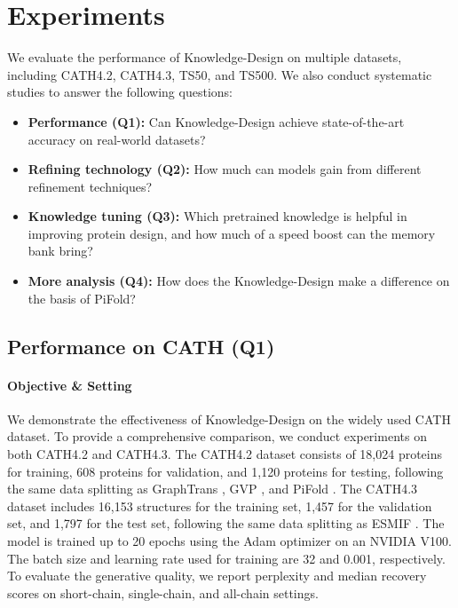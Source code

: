 \documentclass{article}
\begin{document}
 \vspace{-3mm}
\section{Experiments}
\vspace{-3mm}
We evaluate the performance of Knowledge-Design on multiple datasets, including CATH4.2, CATH4.3, TS50, and TS500. We also conduct systematic studies to answer the following questions:
\begin{itemize}[leftmargin=5.5mm]
   \vspace{-2mm}
   \item \textbf{Performance (Q1):} Can Knowledge-Design achieve state-of-the-art accuracy on real-world datasets?
   \vspace{-1mm}
   \item \textbf{Refining technology (Q2):} How much can models gain from different refinement techniques?
   \vspace{-1mm}
   \item \textbf{Knowledge tuning (Q3):}  Which pretrained knowledge is helpful in improving protein design, and how much of a speed boost can the memory bank bring?
   \vspace{-1mm}
   \item \textbf{More analysis (Q4):} How does the Knowledge-Design make a difference on the basis of PiFold?
   \vspace{-1mm}
\end{itemize}
\vspace{-3mm}





\vspace{-3mm}
\subsection{Performance on CATH (Q1)}
\label{sec:exp_cath}
\paragraph{Objective \& Setting} We demonstrate the effectiveness of Knowledge-Design on the widely used CATH \citep{orengo1997cath} dataset. To provide a comprehensive comparison, we conduct experiments on both CATH4.2 and CATH4.3. The CATH4.2 dataset consists of 18,024 proteins for training, 608 proteins for validation, and 1,120 proteins for testing, following the same data splitting as GraphTrans \citep{ingraham2019generative}, GVP \citep{jing2020learning}, and PiFold \citep{gao2023pifold}. The CATH4.3 dataset includes 16,153 structures for the training set, 1,457 for the validation set, and 1,797 for the test set, following the same data splitting as ESMIF \citep{hsu2022learning}. The model is trained up to 20 epochs using the Adam optimizer on an NVIDIA V100. The batch size and learning rate used for training are 32 and 0.001, respectively. To evaluate the generative quality, we report perplexity and median recovery scores on short-chain, single-chain, and all-chain settings.
\end{document}
